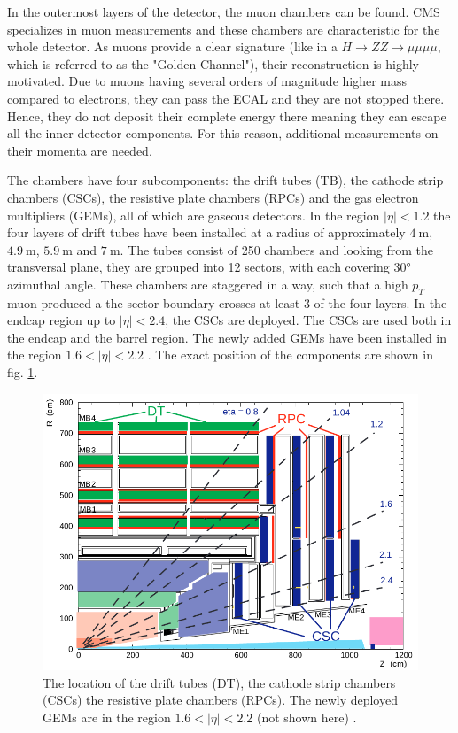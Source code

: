 
In the outermost layers of the detector, the muon chambers can be found. CMS specializes in muon measurements and these chambers are characteristic for the whole detector. As muons provide a clear signature (like in a $H \rightarrow ZZ \rightarrow \mu\mu\mu\mu$, which is referred to as the "Golden Channel"), their reconstruction is highly motivated. Due to muons having several orders of magnitude higher mass compared to electrons, they can pass the ECAL and they are not stopped there.  Hence, they do not deposit their complete energy there meaning they can escape all the inner detector components. For this reason, additional measurements on their momenta are needed.

The chambers have four subcomponents: the drift tubes (TB), the cathode strip chambers (CSCs), the resistive plate chambers (RPCs) and the gas electron multipliers (GEMs), all of which are gaseous detectors. In the region $|\eta|<1.2$ the four layers of drift tubes have been installed at a radius of approximately $\SI{4}{\meter}$, $\SI{4.9}{\meter}$, $\SI{5.9}{\meter}$ and $\SI{7}{\meter}$. The tubes consist of 250 chambers and looking from the transversal plane, they are grouped into 12 sectors, with each covering 30° azimuthal angle. These chambers are staggered in a way, such that a high $p_T$ muon produced a the sector boundary crosses at least 3 of the four layers. In the endcap region up to $|\eta| < 2.4$, the CSCs are deployed. The CSCs are used both in the endcap and the barrel region. The newly added GEMs have been installed in the region $1.6 < |\eta| < 2.2$ \cite{Colaleo:2021453}. The exact position of the components are shown in fig. \ref{fig:muonchambers}.

\begin{figure}[h!]
	\centering
	\includegraphics[width=0.8\linewidth]{figures/theoryexperiment/muonchambers.pdf}
	\caption{The location of the drift tubes (DT), the cathode strip chambers (CSCs) the resistive plate chambers (RPCs). The newly deployed GEMs are in the region $1.6 < |\eta| < 2.2$ (not shown here) \cite{Bayatian:922757}.}
	\label{fig:muonchambers}
\end{figure}

